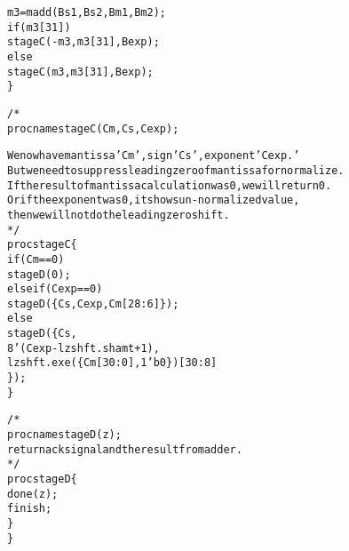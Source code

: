 \begin{reviewlist}
\begin{alltt}
		m3 = madd(Bs1,Bs2,Bm1,Bm2);
		if(m3[31])
			stageC( -m3, m3[31], Bexp );
		else
			stageC(  m3, m3[31], Bexp );
	\}

/*
	proc\textunderscore{}name stageC(Cm, Cs, Cexp);

	We now have mantissa 'Cm', sign 'Cs', exponent 'Cexp.'
	But we need to suppress leading zero of mantissa for normalize.
	If the result of mantissa calculation was 0, we will return 0.
	Or if the exponent was 0, it shows un-normalized value,
	then we will not do the leading zero shift.
*/
	proc stageC \{
		if(Cm==0)
			stageD(0);
		else if(Cexp==0)
			stageD(\{Cs,Cexp,Cm[28:6]\});
		else
			stageD( \{Cs,
				8'(Cexp - lzshft.shamt + 1),
				lzshft.exe(\{Cm[30:0], 1'b0\})[30:8]
				\} );
	\}

/*
	proc\textunderscore{}name stageD(z);
	return ack signal and the result from adder.
*/
	proc stageD \{
		done(z);
		finish;
	\}
\}
\end{alltt}
\end{reviewlist}

